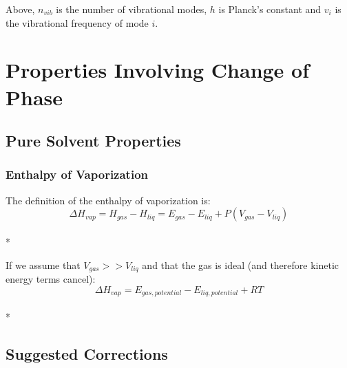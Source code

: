 \documentclass[aps,pre,twocolumn,nofootinbib,superscriptaddress,linenumbers,10pt, draft,tightenlines]{revtex4-1}
\begin{document}
Above, $n_{vib}$ is the number of vibrational modes, $h$ is Planck's constant and $v_i$ is the vibrational frequency of mode $i$.


\section{Properties Involving Change of Phase}
\subsection{Pure Solvent Properties}
\subsubsection{Enthalpy of Vaporization}

The definition of the enthalpy of vaporization is\cite{hvap}:
\begin{equation}\Delta H_{vap} = H_{gas} - H_{liq} = E_{gas} - E_{liq} + P(V_{gas} - V_{liq})\end{equation}\\*

If we assume that $V_{gas} >> V_{liq}$ and that the gas is ideal (and therefore kinetic energy terms cancel):
\begin{equation}\Delta H_{vap} = E_{gas, potential} - E_{liq, potential} + R T\end{equation}\\*




\subsection{Suggested Corrections}
\end{document}
